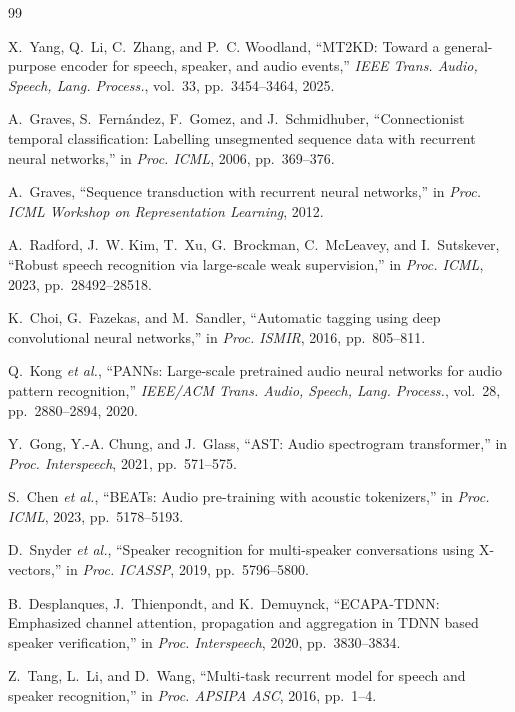 \documentclass[lettersize,journal]{IEEEtran}
\begin{document}
\begin{thebibliography}{99}

X.~Yang, Q.~Li, C.~Zhang, and P.~C. Woodland, ``MT2KD: Toward a general-purpose encoder for speech, speaker, and audio events,'' \emph{IEEE Trans. Audio, Speech, Lang. Process.}, vol.~33, pp.~3454--3464, 2025.

A.~Graves, S.~Fern\'andez, F.~Gomez, and J.~Schmidhuber, ``Connectionist temporal classification: Labelling unsegmented sequence data with recurrent neural networks,'' in \emph{Proc. ICML}, 2006, pp.~369--376.

A.~Graves, ``Sequence transduction with recurrent neural networks,'' in \emph{Proc. ICML Workshop on Representation Learning}, 2012.

A.~Radford, J.~W. Kim, T.~Xu, G.~Brockman, C.~McLeavey, and I.~Sutskever, ``Robust speech recognition via large-scale weak supervision,'' in \emph{Proc. ICML}, 2023, pp.~28492--28518.

K.~Choi, G.~Fazekas, and M.~Sandler, ``Automatic tagging using deep convolutional neural networks,'' in \emph{Proc. ISMIR}, 2016, pp.~805--811.

Q.~Kong \emph{et al.}, ``PANNs: Large-scale pretrained audio neural networks for audio pattern recognition,'' \emph{IEEE/ACM Trans. Audio, Speech, Lang. Process.}, vol.~28, pp.~2880--2894, 2020.

Y.~Gong, Y.-A. Chung, and J.~Glass, ``AST: Audio spectrogram transformer,'' in \emph{Proc. Interspeech}, 2021, pp.~571--575.

S.~Chen \emph{et al.}, ``BEATs: Audio pre-training with acoustic tokenizers,'' in \emph{Proc. ICML}, 2023, pp.~5178--5193.

D.~Snyder \emph{et al.}, ``Speaker recognition for multi-speaker conversations using X-vectors,'' in \emph{Proc. ICASSP}, 2019, pp.~5796--5800.

B.~Desplanques, J.~Thienpondt, and K.~Demuynck, ``ECAPA-TDNN: Emphasized channel attention, propagation and aggregation in TDNN based speaker verification,'' in \emph{Proc. Interspeech}, 2020, pp.~3830--3834.

Z.~Tang, L.~Li, and D.~Wang, ``Multi-task recurrent model for speech and speaker recognition,'' in \emph{Proc. APSIPA ASC}, 2016, pp.~1--4.


\end{thebibliography}
\end{document}
